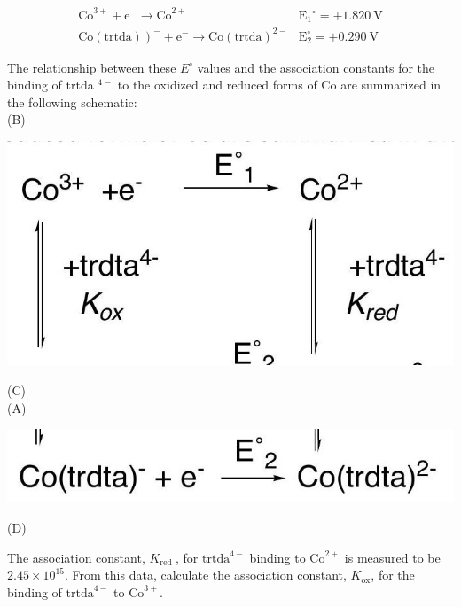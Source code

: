 \documentclass[12pt]{article}
\begin{document}
$$
\begin{array}{ll}
\mathrm{Co}^{3+}+\mathrm{e}^{-} \rightarrow \mathrm{Co}^{2+} & \mathrm{E}_{1}{ }^{\circ}=+1.820 \mathrm{~V} \\
\left.\mathrm{Co} (\text{trtda})\right)^{-}+\mathrm{e}^{-} \rightarrow \mathrm{Co}(\text{trtda})^{2-} & \mathrm{E}_{2}^{\circ}=+0.290 \mathrm{~V}
\end{array}
$$

The relationship between these $E^{\circ}$ values and the association constants for the binding of trtda $^{4-}$ to the oxidized and reduced forms of Co are summarized in the following schematic:\\
(B)

\begin{center}
\includegraphics[max width=\textwidth]{2024_05_26_76014722f19b3362a624g-2}
\end{center}

(C)\\
(A)

\begin{center}
\includegraphics[max width=\textwidth]{2024_05_26_76014722f19b3362a624g-2(1)}
\end{center}

(D)

The association constant, $K_{\text {red }}$, for $\text{trtda}^{4-}$ binding to $\mathrm{Co}^{2+}$ is measured to be $2.45 \times 10^{15}$. From this data, calculate the association constant, $K_{\text{ox}}$, for the binding of $\text{trtda}^{4-}$ to $\mathrm{Co}^{3+}$.
\end{document}
